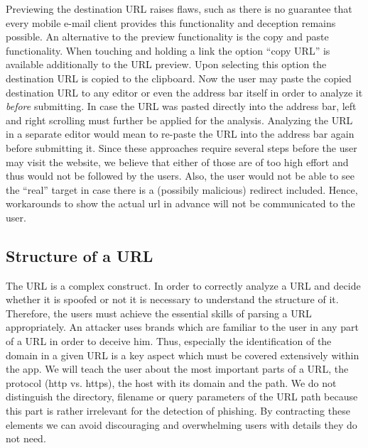 \begin{description}[leftmargin=0cm]
	\item[Show URL Before Click - Copy and Paste] Previewing the destination URL raises flaws, such as there is no guarantee that every mobile e-mail client provides this functionality and deception remains possible. 
An alternative to the preview functionality is the copy and paste functionality.
When touching and holding a link the option ``copy URL'' is available additionally to the URL preview.
Upon selecting this option the destination URL is copied to the clipboard.
Now the user may paste the copied destination URL to any editor or even the address bar itself in order to analyze it \textit{before} submitting.
In case the URL was pasted directly into the address bar, left and right scrolling must further be applied for the analysis. 
Analyzing the URL in a separate editor would mean to re-paste the URL into the address bar again before submitting it.
Since these approaches require several steps before the user may visit the website, we believe that either of those are of too high effort and thus would not be followed by the users.
Also, the user would not be able to see the ``real'' target in case there is a (possibily malicious) redirect included. 
Hence, workarounds to show the actual url in advance will not be communicated to the user.
\end{description}

\subsection{Structure of a URL}
\label{s:url_structure}
The URL is a complex construct. 
In order to correctly analyze a URL and decide whether it is spoofed or not it is necessary to understand the structure of it. 
Therefore, the users must achieve the essential skills of parsing a URL appropriately.
An attacker uses brands which are familiar to the user in any part of a URL in order to deceive him. 
Thus, especially the identification of the domain in a given URL is a key aspect which must be covered extensively within the app. 
We will teach the user about the most important parts of a URL, the protocol (http vs. https), the host with its domain and the path.
We do not distinguish the directory, filename or query parameters of the URL path because this part is rather irrelevant for the detection of phishing.
By contracting these elements we can avoid discouraging and overwhelming users with details they do not need.


